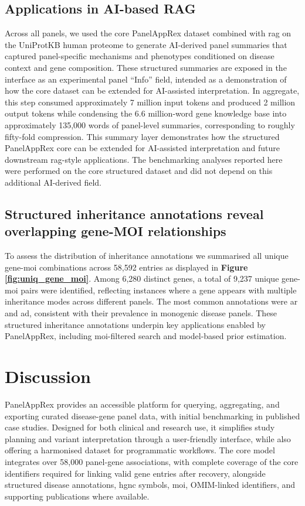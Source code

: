 \subsection{Applications in AI-based RAG}
\noindent
Across all panels, we used the core PanelAppRex dataset combined with \ac{rag} on the UniProtKB human proteome to generate AI-derived panel summaries that captured panel-specific mechanisms and phenotypes conditioned on disease context and gene composition. 
These structured summaries are exposed in the interface as an experimental panel ``Info'' field, intended as a demonstration of how the core dataset can be extended for AI-assisted interpretation. In aggregate, this step consumed approximately 7 million input tokens and produced 2 million output tokens while condensing the 6.6 million-word gene knowledge base into approximately 135,000 words of panel-level summaries, corresponding to roughly fifty-fold compression. This summary layer demonstrates how the structured PanelAppRex core can be extended for AI-assisted interpretation and future downstream \ac{rag}-style applications. The benchmarking analyses reported here were performed on the core structured dataset and did not depend on this additional AI-derived field.

\subsection{Structured inheritance annotations reveal overlapping gene-MOI relationships}

To assess the distribution of inheritance annotations we summarised all unique gene-\ac{moi} combinations across 58,592 entries as displayed in 
\textbf{Figure \ref{fig:uniq_gene_moi}}. Among 6,280 distinct genes, a total of 9,237 unique gene-\ac{moi} pairs were identified, reflecting instances where a gene appears with multiple inheritance modes across different panels. 
The most common annotations were \ac{ar} and \ac{ad}, consistent with their prevalence in monogenic disease panels. 
These structured inheritance annotations underpin key applications 
enabled by PanelAppRex, including \ac{moi}-filtered search and model-based prior estimation.

\FloatBarrier
\section{Discussion}
\noindent
PanelAppRex provides an accessible platform for querying, aggregating, and exporting curated disease-gene panel data, with initial benchmarking in published case studies.
Designed for both clinical and research use, it simplifies study planning and variant interpretation through a user-friendly interface, while also offering a harmonised dataset for programmatic workflows. 
The core model integrates over 58,000 panel-gene associations, with complete coverage of the core identifiers required for linking valid gene entries after recovery, alongside structured disease annotations, \ac{hgnc} symbols, \ac{moi}, OMIM-linked identifiers, and supporting publications where available.


